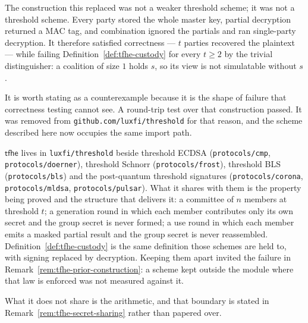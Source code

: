 \begin{remark}
\label{rem:tfhe-prior-construction}
The construction this replaced was not a weaker threshold scheme; it was not a
threshold scheme. Every party stored the whole master key, partial decryption
returned a MAC tag, and combination ignored the partials and ran single-party
decryption. It therefore satisfied correctness --- $t$ parties recovered the
plaintext --- while failing Definition~\ref{def:tfhe-custody} for every
$t \ge 2$ by the trivial distinguisher: a coalition of size $1$ holds $s$, so
its view is not simulatable without $s$.

It is worth stating as a counterexample because it is the shape of failure that
correctness testing cannot see. A round-trip test over that construction
passed. It was removed from \texttt{github.com/luxfi/threshold} for that
reason, and the scheme described here now occupies the same import path.
\end{remark}

\begin{remark}
\label{rem:tfhe-with-the-others}
$\mathsf{tfhe}$ lives in \texttt{luxfi/threshold} beside threshold ECDSA
(\texttt{protocols/cmp}, \texttt{protocols/doerner}), threshold Schnorr
(\texttt{protocols/frost}), threshold BLS (\texttt{protocols/bls}) and the
post-quantum threshold signatures (\texttt{protocols/corona},
\texttt{protocols/mldsa}, \texttt{protocols/pulsar}). What it shares with them
is the property being proved and the structure that delivers it: a committee of
$n$ members at threshold $t$; a generation round in which each member
contributes only its own secret and the group secret is never formed; a use
round in which each member emits a masked partial result and the group secret
is never reassembled. Definition~\ref{def:tfhe-custody} is the same definition
those schemes are held to, with signing replaced by decryption. Keeping them
apart invited the failure in
Remark~\ref{rem:tfhe-prior-construction}: a scheme kept outside the module
where that law is enforced was not measured against it.

What it does not share is the arithmetic, and that boundary is stated in
Remark~\ref{rem:tfhe-secret-sharing} rather than papered over.
\end{remark}

